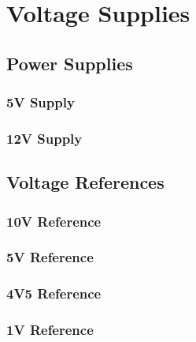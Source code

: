 \section{Voltage Supplies}\label{sec:voltage-supplies}

	\subsection{Power Supplies}\label{ssec:power-supplies}

		\subsubsection{5V Supply}\label{sssec:5v-supply}
		\subsubsection{12V Supply}\label{sssec:12v-supply}

	\subsection{Voltage References}\label{ssec:voltage-references}

		\subsubsection{10V Reference}\label{sssec:10v-reference}
		\subsubsection{5V Reference}\label{sssec:5v-reference}
		\subsubsection{4V5 Reference}\label{sssec:4v5-reference}
		\subsubsection{1V Reference}\label{sssec:1v-reference}